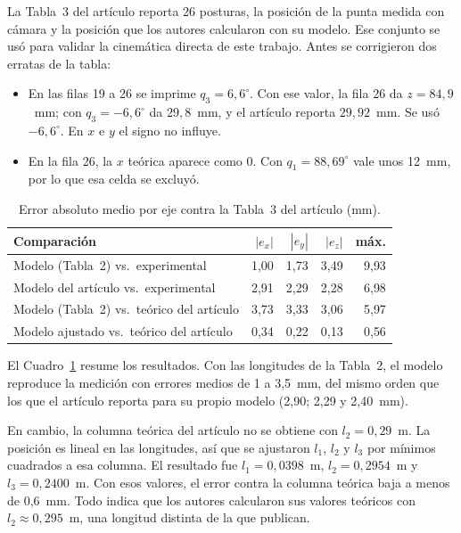\documentclass[11pt,a4paper]{article}
\begin{document}
La Tabla~3 del artículo reporta 26 posturas, la posición de la punta medida con cámara y la posición que los autores calcularon con su modelo. Ese conjunto se usó para validar la cinemática directa de este trabajo. Antes se corrigieron dos erratas de la tabla:
\begin{itemize}
\item En las filas 19 a 26 se imprime \(q_3=6{,}6^\circ\). Con ese valor, la fila 26 da \(z=84{,}9\)~mm; con \(q_3=-6{,}6^\circ\) da \(29{,}8\)~mm, y el artículo reporta \(29{,}92\)~mm. Se usó \(-6{,}6^\circ\). En \(x\) e \(y\) el signo no influye.
\item En la fila 26, la \(x\) teórica aparece como 0. Con \(q_1=88{,}69^\circ\) vale unos 12~mm, por lo que esa celda se excluyó.
\end{itemize}

\begin{table}[ht]
\centering
\caption{Error absoluto medio por eje contra la Tabla~3 del artículo (mm).}
\label{tab:val}
\begin{tabular}{@{}lrrrr@{}}
\toprule
Comparación & \(|e_x|\) & \(|e_y|\) & \(|e_z|\) & máx. \\
\midrule
Modelo (Tabla~2) vs.\ experimental & 1{,}00 & 1{,}73 & 3{,}49 & 9{,}93 \\
Modelo del artículo vs.\ experimental & 2{,}91 & 2{,}29 & 2{,}28 & 6{,}98 \\
Modelo (Tabla~2) vs.\ teórico del artículo & 3{,}73 & 3{,}33 & 3{,}06 & 5{,}97 \\
Modelo ajustado vs.\ teórico del artículo & 0{,}34 & 0{,}22 & 0{,}13 & 0{,}56 \\
\bottomrule
\end{tabular}
\end{table}

El Cuadro~\ref{tab:val} resume los resultados. Con las longitudes de la Tabla~2, el modelo reproduce la medición con errores medios de 1 a 3,5~mm, del mismo orden que los que el artículo reporta para su propio modelo (2,90; 2,29 y 2,40~mm).

En cambio, la columna teórica del artículo no se obtiene con \(l_2=0{,}29\)~m. La posición es lineal en las longitudes, así que se ajustaron \(l_1\), \(l_2\) y \(l_3\) por mínimos cuadrados a esa columna. El resultado fue \(l_1=0{,}0398\)~m, \(l_2=0{,}2954\)~m y \(l_3=0{,}2400\)~m. Con esos valores, el error contra la columna teórica baja a menos de 0,6~mm. Todo indica que los autores calcularon sus valores teóricos con \(l_2\approx 0{,}295\)~m, una longitud distinta de la que publican.
\end{document}
